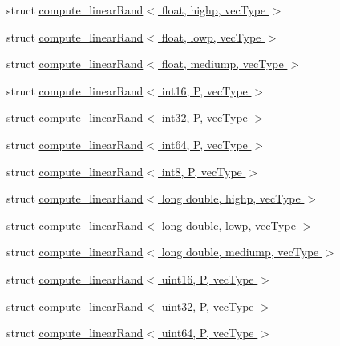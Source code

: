 \begin{DoxyCompactItemize}
\item 
struct \hyperlink{structglm_1_1detail_1_1compute__linear_rand_3_01float_00_01highp_00_01vec_type_01_4}{compute\+\_\+linear\+Rand$<$ float, highp, vec\+Type $>$}
\item 
struct \hyperlink{structglm_1_1detail_1_1compute__linear_rand_3_01float_00_01lowp_00_01vec_type_01_4}{compute\+\_\+linear\+Rand$<$ float, lowp, vec\+Type $>$}
\item 
struct \hyperlink{structglm_1_1detail_1_1compute__linear_rand_3_01float_00_01mediump_00_01vec_type_01_4}{compute\+\_\+linear\+Rand$<$ float, mediump, vec\+Type $>$}
\item 
struct \hyperlink{structglm_1_1detail_1_1compute__linear_rand_3_01int16_00_01_p_00_01vec_type_01_4}{compute\+\_\+linear\+Rand$<$ int16, P, vec\+Type $>$}
\item 
struct \hyperlink{structglm_1_1detail_1_1compute__linear_rand_3_01int32_00_01_p_00_01vec_type_01_4}{compute\+\_\+linear\+Rand$<$ int32, P, vec\+Type $>$}
\item 
struct \hyperlink{structglm_1_1detail_1_1compute__linear_rand_3_01int64_00_01_p_00_01vec_type_01_4}{compute\+\_\+linear\+Rand$<$ int64, P, vec\+Type $>$}
\item 
struct \hyperlink{structglm_1_1detail_1_1compute__linear_rand_3_01int8_00_01_p_00_01vec_type_01_4}{compute\+\_\+linear\+Rand$<$ int8, P, vec\+Type $>$}
\item 
struct \hyperlink{structglm_1_1detail_1_1compute__linear_rand_3_01long_01double_00_01highp_00_01vec_type_01_4}{compute\+\_\+linear\+Rand$<$ long double, highp, vec\+Type $>$}
\item 
struct \hyperlink{structglm_1_1detail_1_1compute__linear_rand_3_01long_01double_00_01lowp_00_01vec_type_01_4}{compute\+\_\+linear\+Rand$<$ long double, lowp, vec\+Type $>$}
\item 
struct \hyperlink{structglm_1_1detail_1_1compute__linear_rand_3_01long_01double_00_01mediump_00_01vec_type_01_4}{compute\+\_\+linear\+Rand$<$ long double, mediump, vec\+Type $>$}
\item 
struct \hyperlink{structglm_1_1detail_1_1compute__linear_rand_3_01uint16_00_01_p_00_01vec_type_01_4}{compute\+\_\+linear\+Rand$<$ uint16, P, vec\+Type $>$}
\item 
struct \hyperlink{structglm_1_1detail_1_1compute__linear_rand_3_01uint32_00_01_p_00_01vec_type_01_4}{compute\+\_\+linear\+Rand$<$ uint32, P, vec\+Type $>$}
\item 
struct \hyperlink{structglm_1_1detail_1_1compute__linear_rand_3_01uint64_00_01_p_00_01vec_type_01_4}{compute\+\_\+linear\+Rand$<$ uint64, P, vec\+Type $>$}

\end{DoxyCompactItemize}
